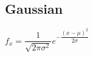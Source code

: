 
\subsection{Gaussian}

\(f_x=\dfrac{1}{\sqrt {2\pi \sigma^2 }} e^{-\dfrac{(x-\mu)^2}{2\sigma }}\)


